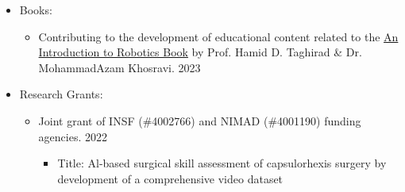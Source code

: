 \documentclass[11pt,a4paper,sans]{moderncv} %
\begin{document}
\begin{itemize}
\begin{itemize}
			
		\end{itemize}
  \vspace{1em}
  \item Books:
  		\begin{itemize}
			\item {} Contributing to the development of educational content related to the  \href{https://aras.kntu.ac.ir/publications/books/robotics/}{An Introduction to Robotics Book} by Prof. Hamid D. Taghirad \& Dr. MohammadAzam Khosravi. \hfill 2023
   \end{itemize}
   \vspace{1em}
  \item Research Grants:
  		\begin{itemize}
			\item {} Joint grant of INSF (\#4002766) and NIMAD (\#4001190) funding agencies. \hfill 2022
   \begin{itemize}
 \item Title: Al-based surgical skill assessment of capsulorhexis surgery by development of a comprehensive video dataset
   \end{itemize}
			
		\end{itemize}
	\end{itemize}
\end{document}
